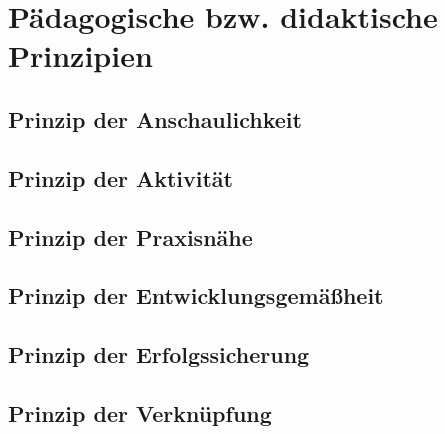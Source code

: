 \chapter{Pädagogische bzw. didaktische Prinzipien}

\section{Prinzip der Anschaulichkeit}

\section{Prinzip der Aktivität}

\section{Prinzip der Praxisnähe}

\section{Prinzip der Entwicklungsgemäßheit}

\section{Prinzip der Erfolgssicherung}

\section{Prinzip der Verknüpfung}
